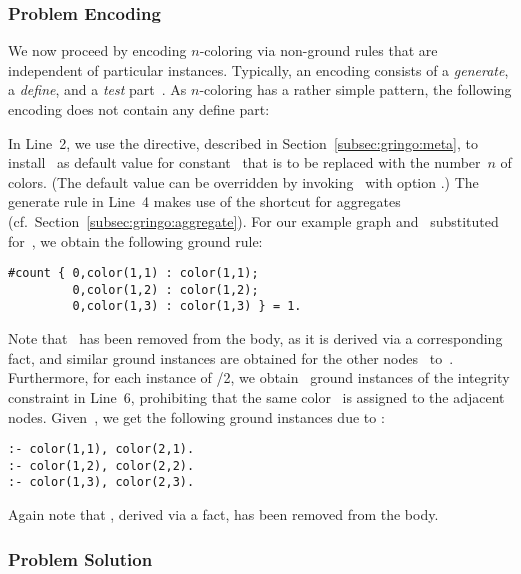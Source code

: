 \subsubsection{Problem Encoding}\label{subsec:color:encoding}

We now proceed by encoding $n$-coloring via non-ground rules that are
independent of particular instances.
Typically, an encoding consists of a \emph{generate}, a \emph{define},
and a \emph{test} part~\cite{lifschitz02a}.
As $n$-coloring has a rather simple pattern, the following encoding does
not contain any define part:
%

%
In Line~2, we use the  directive,
described in Section~\ref{subsec:gringo:meta},
to install~ as default value for constant~ that is to be replaced
with the number~$n$ of colors.
(The default value can be overridden by invoking \gringo\ with option
 .)
The generate rule in Line~4 makes use of the shortcut for  aggregates
(cf.\ Section~\ref{subsec:gringo:aggregate}).
For our example graph and~ substituted for~,
we obtain the following ground rule:%
%
\begin{lstlisting}[numbers=none]
#count { 0,color(1,1) : color(1,1);
         0,color(1,2) : color(1,2);
         0,color(1,3) : color(1,3) } = 1.
\end{lstlisting}
%
Note that~ has been removed from the body,
as it is derived via a corresponding fact,
and similar ground instances are obtained for the other nodes~ to~.
Furthermore, for each instance of /2,
we obtain~ ground instances of the integrity constraint in Line~6,
prohibiting that the same color~ is assigned to the adjacent nodes.
Given~,
we get the following ground instances due to :
%
\begin{lstlisting}[numbers=none]
:- color(1,1), color(2,1).
:- color(1,2), color(2,2).
:- color(1,3), color(2,3).
\end{lstlisting}
%
Again note that ,
derived via a fact, has been removed from the body.

\subsubsection{Problem Solution}\label{subsec:color:solution}


